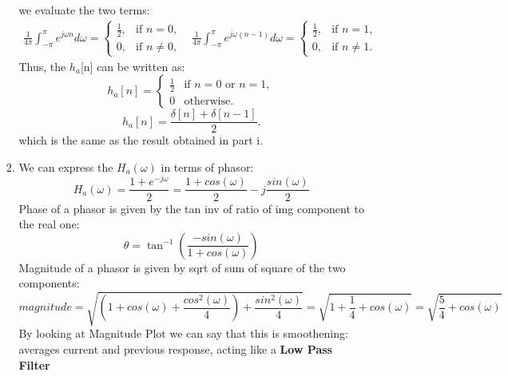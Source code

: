 \documentclass{article}
\begin{document}
\begin{enumerate}
\begin{enumerate}
\begin{enumerate}
\[                \]
                we evaluate the two terms:
                \[
                    \begin{array}{cc}
                        \frac{1}{4\pi} \int_{-\pi}^{\pi} e^{j\omega n} d\omega =
                        \begin{cases}
                            \frac{1}{2}, & \text{if } n = 0, \\
                            0, & \text{if } n \neq 0,
                        \end{cases}
                        &
                        \frac{1}{4\pi} \int_{-\pi}^{\pi} e^{j\omega (n-1)} d\omega =
                        \begin{cases}
                            \frac{1}{2}, & \text{if } n = 1, \\
                            0, & \text{if } n \neq 1.
                        \end{cases}
                    \end{array}
                \]
                Thus, the $h_a$[n] can be written as:
                \[
                    h_a[n] =
                        \begin{cases} 
                        \frac{1}{2} & \text{if } n = 0 \text{ or } n = 1, \\
                        0 & \text{otherwise.}
                        \end{cases}
                \]
                \[
                    h_a[n] =\frac{\delta[n] + \delta[n-1]}{2}.
                \]
                which is the same as the result obtained in part i.
            \item 
                We can express the $H_a(\omega)$ in terms of phasor:
                \[
                    H_a(\omega) = \frac{1 + e^{-j\omega}}{2} = \frac{1 + cos(\omega)}{2} - j \frac{sin(\omega)}{2}
                \]
                Phase of a phasor is given by the tan inv of ratio of img component to the real one:
                \[
                    \theta = \tan^{-1} \left( \frac{-sin(\omega)}{1 + cos(\omega)} \right)
                \]
                Magnitude of a phasor is given by sqrt of sum of square of the two components:
                \[
                    magnitude = \sqrt{\left( 1 + cos(\omega) + \frac{cos^2(\omega)}{4} \right) + \frac{sin^2(\omega)}{4}} = \sqrt{1 + \frac{1}{4} + cos(\omega)} = \sqrt{\frac{5}{4} + cos(\omega)}
                \]
                By looking at Magnitude Plot we can say that this is smoothening: averages current and previous response, acting like a \textbf{Low Pass Filter}

\end{enumerate}
\end{enumerate}
\end{enumerate}
\end{document}
